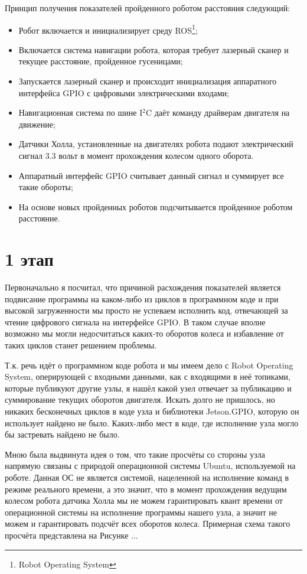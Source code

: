 \documentclass[12pt,a4paper]{scrartcl}
\begin{document}
			Принцип получения показателей пройденного роботом расстояния следующий:
			\begin{itemize}
				\item Робот включается и инициализирует среду ROS\footnote{Robot Operating System};
				\item Включается система навигации робота, которая требует лазерный сканер и текущее расстояние, пройденное гусеницами;
				\item Запускается лазерный сканер и происходит инициализация аппаратного интерфейса GPIO с цифровыми электрическими входами;
				\item Навигационная система по шине I$^2$C даёт команду драйверам двигателя на движение;
				\item Датчики Холла, установленные на двигателях робота подают электрический сигнал 3.3 вольт в момент прохождения колесом одного оборота.
				\item Аппаратный интерфейс GPIO считывает данный сигнал и суммирует все такие обороты;
				\item На основе новых пройденных роботов подсчитывается пройденное роботом расстояние.
			\end{itemize}
			
		\section*{1 этап}
			Первоначально я посчитал, что причиной расхождения показателей является подвисание программы на каком-либо из циклов в программном коде и при высокой загруженности мы просто не успеваем исполнить код, отвечающей за чтение цифрового сигнала на интерфейсе GPIO. В таком случае вполне возможно мы могли недосчитаться каких-то оборотов колеса и избавление от таких циклов станет решением проблемы.
			
			Т.к. речь идёт о программном коде робота и мы имеем дело с Robot Operating System, оперирующей с входными данными, как с входящими в неё топиками, которые публикуют другие узлы, я нашёл какой узел отвечает за публикацию и суммирование текущих оборотов двигателя. Искать долго не пришлось, но никаких бесконечных циклов в коде узла и библиотеки Jetson.GPIO, которую он использует найдено не было. Каких-либо мест в коде, где исполнение узла могло бы застревать найдено не было. 
			
			Мною была выдвинута идея о том, что такие просчёты со стороны узла напрямую связаны с природой операционной системы Ubuntu, используемой на роботе. Данная ОС не является системой, нацеленной на исполнение команд в режиме реального времени, а это значит, что в момент прохождения ведущим колесом робота датчика Холла мы не можем гарантировать квант времени от операционной системы на исполнение программы нашего узла, а значит не можем и гарантировать подсчёт всех оборотов колеса. Примерная схема такого просчёта представлена на Рисунке ...
			
\end{document}
